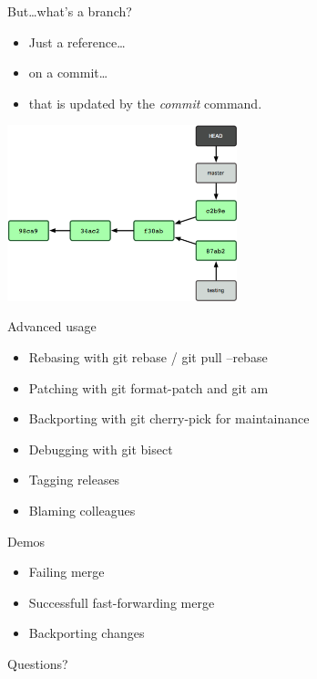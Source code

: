 \documentclass{beamer}
\begin{document}
\begin{frame}{But\dots what's a branch?}
   \begin{itemize}
      \item Just a reference\dots\pause
      \item on a commit\dots\pause
      \item that is updated by the \emph{commit} command.
   \end{itemize}
   \begin{center}
   \includegraphics[width=0.5\textwidth]{branches-inside.png}
   \end{center}
\end{frame}

\begin{frame}{Advanced usage}
    \begin{itemize}
        \item Rebasing with git rebase / git pull --rebase
        \pause
        \item Patching with git format-patch and git am
        \pause
        \item Backporting with git cherry-pick for maintainance
        \pause
        \item Debugging with git bisect
        \pause
        \item Tagging releases
        \pause
        \item Blaming colleagues
    \end{itemize}
\end{frame}

\begin{frame}{Demos}
   \begin{itemize}
      \item Failing merge
      \pause
      \item Successfull fast-forwarding merge
      \pause
      \item Backporting changes
   \end{itemize}
\end{frame}

\begin{frame}{Questions?}
\end{frame}
\end{document}
